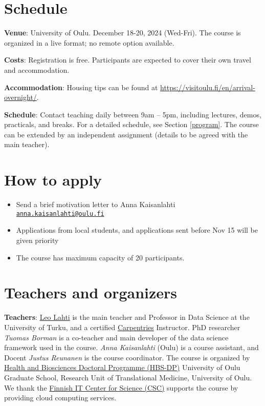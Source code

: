 \documentclass[
  oneside]{book}
\providecommand{\tightlist}{%
  \setlength{\itemsep}{0pt}\setlength{\parskip}{0pt}}
\begin{document}
\hypertarget{schedule}{%
\section{Schedule}\label{schedule}}

\textbf{Venue}: University of Oulu. December 18-20, 2024 (Wed-Fri). The course is organized in a live format; no remote option available.

\textbf{Costs}: Registration is free. Participants are expected to cover their own travel and accommodation.

\textbf{Accommodation}: Housing tips can be found at \url{https://visitoulu.fi/en/arrival-overnight/}.

\textbf{Schedule}: Contact teaching daily between 9am -- 5pm, including lectures, demos, practicals, and breaks. For a detailed schedule, see Section \ref{program}. The course can be extended by an independent assignment (details to be agreed with the main teacher).

\hypertarget{how-to-apply}{%
\section{How to apply}\label{how-to-apply}}

\begin{itemize}
\tightlist
\item
  Send a brief motivation letter to Anna Kaisanlahti \href{mailto:anna.kaisanlahti@oulu.fi}{\nolinkurl{anna.kaisanlahti@oulu.fi}}
\item
  Applications from local students, and applications sent before Nov 15 will be given priority
\item
  The course has maximum capacity of 20 participants.
\end{itemize}

\hypertarget{teachers-and-organizers}{%
\section{Teachers and organizers}\label{teachers-and-organizers}}

\textbf{Teachers}: \href{https://datascience.utu.fi}{Leo Lahti} is the main teacher and Professor in Data Science at the University of Turku, and a certified \href{https://carpentries.org}{Carpentries} Instructor. PhD researcher \emph{Tuomas Borman} is a co-teacher and main developer of the data science framework used in the course. \emph{Anna Kaisanlahti} (Oulu) is a course assistant, and Docent \emph{Justus Reunanen} is the course coordinator. The course is organized by \href{https://www.oulu.fi/en/research/graduate-school/organisation-and-contact-information-uniogs/health-and-biosciences-doctoral-programme}{Health and Biosciences Doctoral Programme (HBS-DP)} University of Oulu Graduate School, Research Unit of Translational Medicine, University of Oulu. We thank the \href{https://csc.fi/}{Finnish IT Center for Science (CSC)} supports the course by providing cloud computing services.
\end{document}
